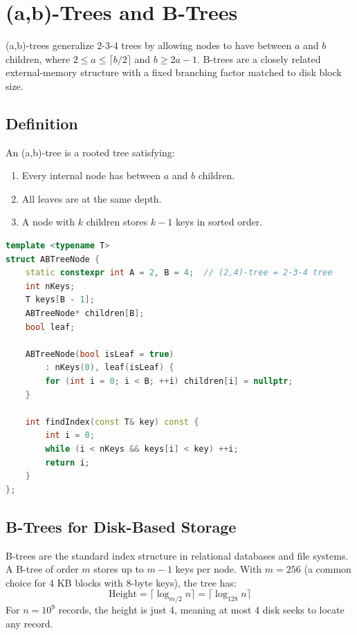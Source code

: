 \section{(a,b)-Trees and B-Trees}
\label{sec:ab-trees}

(a,b)-trees generalize 2-3-4 trees by allowing nodes to have between $a$ and $b$ children, where $2 \leq a \leq \lceil b/2 \rceil$ and $b \geq 2a - 1$. B-trees are a closely related external-memory structure with a fixed branching factor matched to disk block size.

\subsection{Definition}
\label{sec:ab-definition}

An (a,b)-tree is a rooted tree satisfying:
\begin{enumerate}
    \item Every internal node has between $a$ and $b$ children.
    \item All leaves are at the same depth.
    \item A node with $k$ children stores $k-1$ keys in sorted order.
\end{enumerate}

\begin{lstlisting}[language=C++]
template <typename T>
struct ABTreeNode {
    static constexpr int A = 2, B = 4;  // (2,4)-tree = 2-3-4 tree
    int nKeys;
    T keys[B - 1];
    ABTreeNode* children[B];
    bool leaf;

    ABTreeNode(bool isLeaf = true)
        : nKeys(0), leaf(isLeaf) {
        for (int i = 0; i < B; ++i) children[i] = nullptr;
    }

    int findIndex(const T& key) const {
        int i = 0;
        while (i < nKeys && keys[i] < key) ++i;
        return i;
    }
};
\end{lstlisting}

\subsection{B-Trees for Disk-Based Storage}
\label{sec:btree-disk}

B-trees are the standard index structure in relational databases and file systems. A B-tree of order $m$ stores up to $m-1$ keys per node. With $m = 256$ (a common choice for 4 KB blocks with 8-byte keys), the tree has:
\[
  \text{Height} = \lceil \log_{m/2} n \rceil = \lceil \log_{128} n \rceil
\]
For $n = 10^9$ records, the height is just 4, meaning at most 4 disk seeks to locate any record.

